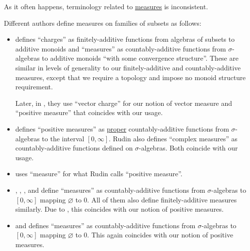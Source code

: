 \begin{remark}\label{rem:measure_terminology}
  As it often happens, terminology related to \hyperref[def:measure/measure]{measures} is inconsistent.

  Different authors define measures on families of subsets as follows:
  \begin{itemize}
    \item {} defines \enquote{charges} as finitely-additive functions from algebras of subsets to additive monoids and \enquote{measures} as countably-additive functions from \( \sigma \)-algebras to additive monoids \enquote{with some convergence structure}. These are similar in levels of generality to our finitely-additive and countably-additive measures, except that we require a topology and impose no monoid structure requirement.

    Later, in \cite[\S 11.41]{Schechter1997AnalysisHandbook}, they use \enquote{vector charge} for our notion of vector measure and \enquote{positive measure} that coincides with our usage.

    \item {} defines \enquote{positive measures} as \hyperref[def:effective_domain]{proper} countably-additive functions from \( \sigma \)-algebras to the interval \( [0, \infty] \). Rudin also defines \enquote{complex measures} as countably-additive functions defined on \( \sigma \)-algebras. Both coincide with our usage.

    \item {} uses \enquote{measure} for what Rudin calls \enquote{positive measure}.

    \item {}, , ,  and  define \enquote{measures} as countably-additive functions from \( \sigma \)-algebras to \( [0, \infty] \) mapping \( \varnothing \) to \( 0 \). All of them also define finitely-additive measures similarly. Due to , this coincides with our notion of positive measures.

    \item {} and  defines \enquote{measures} as countably-additive functions from \( \sigma \)-algebras to \( [0, \infty] \) mapping \( \varnothing \) to \( 0 \). This again coincides with our notion of positive measures.


\end{itemize}
\end{remark}
